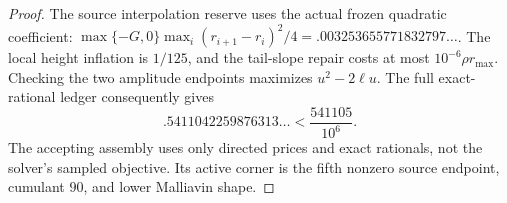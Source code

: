 \begin{proof}
The source interpolation reserve uses the actual frozen quadratic
coefficient: $\max\{-G,0\}\max_i(r_{i+1}-r_i)^2/4
=.003253655771832797\ldots$.
The local height inflation is $1/125$,
and the tail-slope repair costs at most
$10^{-6}\rho r_{\max}$. Checking the two amplitude endpoints maximizes
$u^2-2\ell u$. The full exact-rational ledger consequently gives
\[
 .5411042259876313\ldots<\frac{541105}{10^6}.
\]
The accepting assembly uses only directed prices and exact rationals,
not the solver's sampled objective. Its active corner is the fifth
nonzero source endpoint, cumulant $90$, and lower Malliavin shape.
\end{proof}
